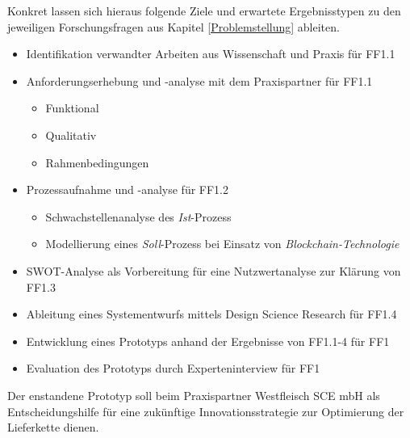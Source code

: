 Konkret lassen sich hieraus folgende Ziele und erwartete Ergebnisstypen zu den jeweiligen Forschungsfragen aus Kapitel \ref{Problemstellung} ableiten.

\begin{itemize}
  \item Identifikation verwandter Arbeiten aus Wissenschaft und Praxis für FF1.1
  \item Anforderungserhebung und -analyse mit dem Praxispartner für FF1.1
  \begin{itemize}
    \item Funktional
    \item Qualitativ
    \item Rahmenbedingungen
  \end{itemize}
  \item Prozessaufnahme und -analyse für FF1.2
  \begin{itemize}
    \item Schwachstellenanalyse des \textit{Ist}-Prozess
    \item Modellierung eines \textit{Soll}-Prozess bei Einsatz von \textit{Blockchain-Technologie}
  \end{itemize}
  \item SWOT-Analyse als Vorbereitung für eine Nutzwertanalyse zur Klärung von FF1.3
  \item Ableitung eines Systementwurfs mittels Design Science Research für FF1.4
  \item Entwicklung eines Prototyps anhand der Ergebnisse von FF1.1-4 für FF1
  \item Evaluation des Prototyps durch Experteninterview für FF1
\end{itemize}

Der enstandene Prototyp soll beim Praxispartner Westfleisch SCE mbH als Entscheidungshilfe für eine zukünftige Innovationsstrategie zur Optimierung der Lieferkette dienen.


